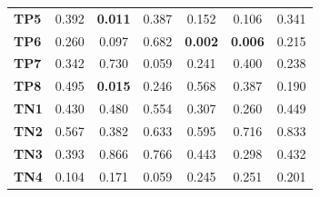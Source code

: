 \begin{table}
\begin{tabular}{lccc|ccc}
        \textbf{TP5}  & 0.392                                   & \cellcolor[HTML]{EFEFEF}\textbf{0.011}            & 0.387                                  & 0.152                                    & 0.106                                  & 0.341                                  \\
        \textbf{TP6}  & 0.260                                   & 0.097                                             & 0.682                                  & \cellcolor[HTML]{EFEFEF}\textbf{0.002}   & \cellcolor[HTML]{EFEFEF}\textbf{0.006} & 0.215                                  \\
        \textbf{TP7}  & 0.342                                   & 0.730                                             & 0.059                                  & 0.241                                    & 0.400                                  & 0.238                                  \\
        \textbf{TP8}  & 0.495                                   & \cellcolor[HTML]{EFEFEF}\textbf{0.015}            & 0.246                                  & 0.568                                    & 0.387                                  & 0.190                                  \\
        \textbf{TN1}  & 0.430                                   & 0.480                                             & 0.554                                  & 0.307                                    & 0.260                                  & 0.449                                  \\
        \textbf{TN2}  & 0.567                                   & 0.382                                             & 0.633                                  & 0.595                                    & 0.716                                  & 0.833                                  \\
        \textbf{TN3}  & 0.393                                   & 0.866                                             & 0.766                                  & 0.443                                    & 0.298                                  & 0.432                                  \\
        \textbf{TN4}  & 0.104                                   & 0.171                                             & 0.059                                  & 0.245                                    & 0.251                                  & 0.201                                  \\

\end{tabular}
\end{table}
